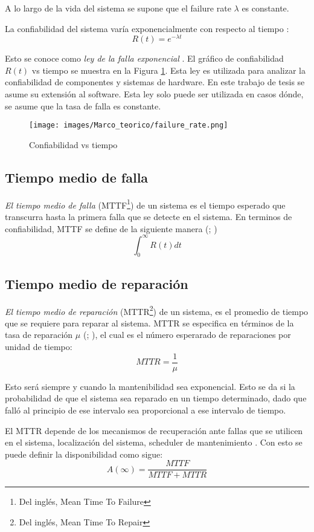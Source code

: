 A lo largo de la vida del sistema se supone que el failure rate $\lambda$ es constante. 

La confiabilidad del sistema varía exponencialmente con respecto al tiempo \citep{FTDesign}: $$R(t) = e^{- \lambda t}$$

Esto se conoce como \textit{ley de la falla exponencial} \citep{FTDesign}. El gráfico de confiabilidad $R(t)$ vs tiempo se muestra en la Figura \ref{fig:failure_rate}. Esta ley es utilizada para analizar la confiabilidad de componentes y sistemas de hardware. En este trabajo de tesis se asume su extensión al software. Esta ley solo puede ser utilizada en casos dónde, se asume que la tasa de falla es constante. \citep{FTDesign}

\begin{figure}[h]
 \centering
 \texttt{[image: images/Marco\_teorico/failure\_rate.png]}
  \caption{Confiabilidad vs tiempo }
\label{fig:failure_rate}
\end{figure}

\subsection{Tiempo medio de falla}
\textit{El tiempo medio de falla} (MTTF\footnote{Del inglés, Mean Time To Failure}) de un sistema es el tiempo esperado que transcurra hasta la primera falla que se
detecte en el sistema. En terminos de confiabilidad, MTTF se define de la siguiente manera (\citep{FTDesign}; \citep{Rausand04}) $$\int_0^{\infty} R(t) dt$$

\subsection{Tiempo medio de reparación}
\textit{El tiempo medio de reparación} (MTTR\footnote{Del inglés, Mean Time To Repair})
de un sistema, es el promedio de tiempo que se requiere para reparar al sistema.
MTTR se especifica en términos de la tasa de reparación $\mu$ (\citep{FTDesign}; \citep{Rausand04}), el cual es el número esperarado de reparaciones por unidad de tiempo: $$MTTR = \frac{1}{\mu}$$

Esto será siempre y cuando la mantenibilidad sea exponencial. Esto se da si la probabilidad de que el sistema sea reparado en un tiempo determinado, dado que falló al principio de ese intervalo sea proporcional a ese intervalo de tiempo.

El MTTR depende de los mecanismos de recuperación ante fallas que se utilicen en el sistema, localización del sistema, scheduler de mantenimiento \citep{FTDesign}. Con esto se puede definir la disponibilidad como sigue: $$A(\infty) = \frac{MTTF}{MTTF+MTTR}$$

